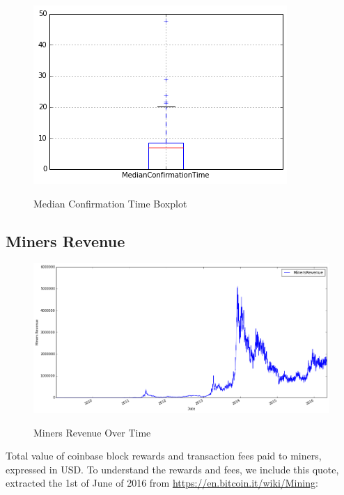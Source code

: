 \begin{figure}[bth]
  \myfloatalign
  {\includegraphics[width=1\linewidth]
    {gfx/median-confirmation-time-boxplot}}
  \caption{Median Confirmation Time Boxplot}
  \label{fig:median-confirmation-time-boxplot}
\end{figure}

\clearpage

\subsection{Miners Revenue}
\label{sec:miners-revenue}

\begin{figure}[bth]
  \myfloatalign
  {\includegraphics[width=1\linewidth]
    {gfx/miners-revenue-over-time}}
  \caption{Miners Revenue Over Time}
  \label{fig:miners-revenue-over-time}
\end{figure}

Total value of coinbase block rewards and transaction fees paid to
miners, expressed in USD. To understand the rewards and fees, we
include this quote, extracted the 1st of June of 2016 from
\href{https://en.bitcoin.it/wiki/Mining}{https://en.bitcoin.it/wiki/Mining}:

